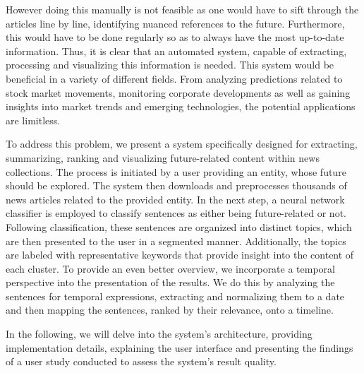\documentclass[sigconf]{acmart}
\begin{document}
\noindent However doing this manually is not feasible as one would have to sift through the articles line by line, identifying nuanced references to the future. Furthermore, this would have to be done regularly so as to always have the most up-to-date information. Thus, it is clear that an automated system, capable of extracting, processing and visualizing this information is needed. This system would be beneficial in a variety of different fields. From analyzing predictions related to stock market movements, monitoring corporate developments as well as gaining insights into market trends and emerging technologies, the potential applications are limitless.

\noindent To address this problem, we present a system specifically designed for extracting, summarizing, ranking and visualizing future-related content within news collections. The process is initiated by a user providing an entity, whose future should be explored. The system then downloads and preprocesses thousands of news articles related to the provided entity. In the next step, a neural network classifier is employed to classify sentences as either being future-related or not. Following classification, these sentences are organized into distinct topics, which are then presented to the user in a segmented manner. Additionally, the topics are labeled with representative keywords that provide insight into the content of each cluster. To provide an even better overview, we incorporate a temporal perspective into the presentation of the results. We do this by analyzing the sentences for temporal expressions, extracting and normalizing them to a date and then mapping the sentences, ranked by their relevance, onto a timeline.

\noindent In the following, we will delve into the system's architecture, providing implementation details, explaining the user interface and presenting the findings of a user study conducted to assess the system's result quality.

\end{document}
